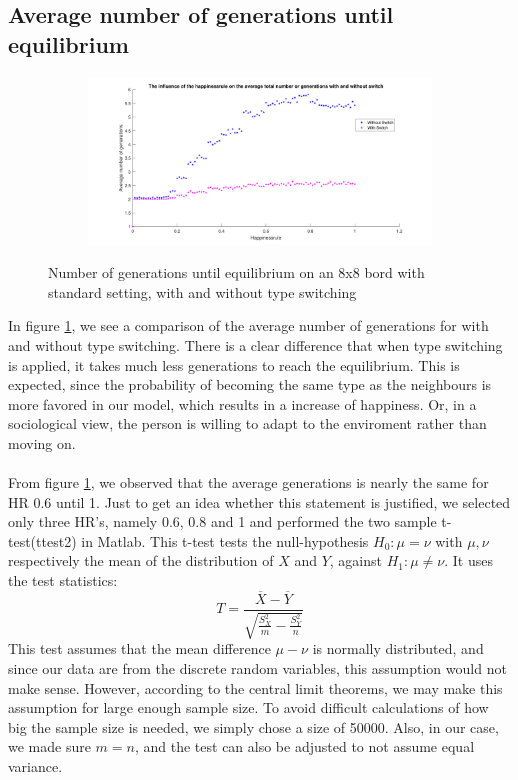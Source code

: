 \subsection{Average number of generations until equilibrium}
\begin{figure}[H]
	\centering
    \begin{subfigure}{0.9\textwidth}
        \includegraphics[width=\textwidth]{happinessrule-totaantgenwithswitchorwithoutswitch}
    \end{subfigure}
    \caption{Number of generations until equilibrium on an 8x8 bord with standard setting, with and without type switching}
    \label{fig:AantGenS}
\end{figure}
In figure \ref{fig:AantGenS}, we see a comparison of the average number of generations for with and without type switching. There is a clear difference that when type switching is applied, it takes much less generations to reach the equilibrium. This is expected, since the probability of becoming the same type as the neighbours is more favored in our model, which results in a increase of happiness. Or, in a sociological view, the person is willing to adapt to the enviroment rather than moving on.\\
\\
From figure \ref{fig:AantGenS}, we observed that the average generations is nearly the same for HR 0.6 until 1. Just to get an idea whether this statement is justified, we selected only three HR's, namely 0.6, 0.8 and 1 and performed the two sample t-test(ttest2) in Matlab. This t-test tests the null-hypothesis $H_0:\mu=\nu$ with $\mu,\nu$ respectively the mean of the distribution of $X$ and $Y$, against $H_1:\mu\neq\nu$. It uses the test statistics:
 \[T=\frac{\overline{X}-\overline{Y}}{\sqrt{\frac{S^2_X}{m}-\frac{S^2_Y}{n}}}\]
This test assumes that the mean difference $\mu-\nu$ is normally distributed, and since our data are from the discrete random variables, this assumption would not make sense. However, according to the central limit theorems, we may make this assumption for large enough sample size. To avoid difficult calculations of how big the sample size is needed, we simply chose a size of 50000. Also, in our case, we made sure $m=n$, and the test can also be adjusted to not assume equal variance.\\
